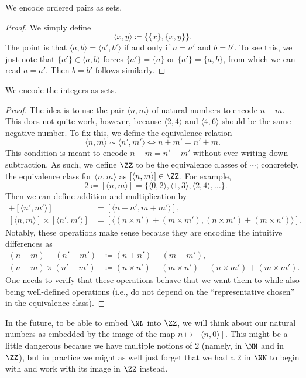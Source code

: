 \documentclass[../notes.tex]{subfiles}
\begin{document}
\begin{exe}
	We encode ordered pairs as sets.
\end{exe}
\begin{proof}
	We simply define
	\[\langle x,y\rangle\coloneqq\{\{x\},\{x,y\}\}.\]
	The point is that $\langle a,b\rangle=\langle a',b'\rangle$ if and only if $a=a'$ and $b=b'$. To see this, we just note that $\{a'\}\in\langle a,b\rangle$ forces $\{a'\}=\{a\}$ or $\{a'\}=\{a,b\}$, from which we can read $a=a'$. Then $b=b'$ follows similarly.
\end{proof}
\begin{exe}
	We encode the integers as sets.
\end{exe}
\begin{proof}
	The idea is to use the pair $\langle n,m\rangle$ of natural numbers to encode $n-m$. This does not quite work, however, because $\langle2,4\rangle$ and $\langle4,6\rangle$ should be the same negative number. To fix this, we define the equivalence relation
	\[\langle n,m\rangle\sim\langle n',m'\rangle\iff n+m'=n'+m.\]
	This condition is meant to encode $n-m=n'-m'$ without ever writing down subtraction. As such, we define $\ZZ$ to be the equivalence classes of $\sim$; concretely, the equivalence class for $\langle n,m\rangle$ as $[\langle n,m\rangle]\in\ZZ$. For example,
	\[-2\coloneqq[\langle n,m\rangle]=\{\langle0,2\rangle,\langle1,3\rangle,\langle2,4\rangle,\ldots\}.\]
	Then we can define addition and multiplication by
	\begin{align*}
		[\langle n,m\rangle]+[\langle n',m'\rangle] &= [\langle n+n',m+m'\rangle], \\
		[\langle n,m\rangle]\times[\langle n',m'\rangle] &= [\langle (n\times n')+(m\times m'),(n\times m')+(m\times n')\rangle].
	\end{align*}
	Notably, these operations make sense because they are encoding the intuitive differences as
	\begin{align*}
		(n-m)+(n'-m') &\coloneqq (n+n')-(m+m'), \\
		(n-m)\times(n'-m') &\coloneqq (n\times n')-(m\times n')-(n\times m')+(m\times m').
	\end{align*}
	One needs to verify that these operations behave that we want them to while also being well-defined operations (i.e., do not depend on the ``representative chosen'' in the equivalence class).
\end{proof}
\begin{remark}
	In the future, to be able to embed $\NN$ into $\ZZ$, we will think about our natural numbers as embedded by the image of the map $n\mapsto[\langle n,0\rangle]$. This might be a little dangerous because we have multiple notions of $2$ (namely, in $\NN$ and in $\ZZ$), but in practice we might as well just forget that we had a $2$ in $\NN$ to begin with and work with its image in $\ZZ$ instead.
\end{remark}
\end{document}
